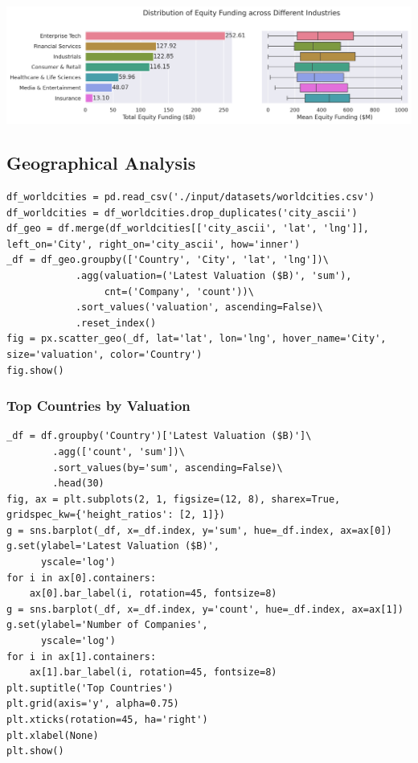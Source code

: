 \documentclass[a4paper,12pt]{article}
\begin{document}
\begin{center}
\includegraphics[width=.9\linewidth]{./.ob-jupyter/215e6c23cbc5b3bf332aa16d0f2fb53af47c666f.png}
\label{}
\end{center}
\subsection{Geographical Analysis}
\label{sec:orgfcdbb95}

\begin{verbatim}
df_worldcities = pd.read_csv('./input/datasets/worldcities.csv')
df_worldcities = df_worldcities.drop_duplicates('city_ascii')
df_geo = df.merge(df_worldcities[['city_ascii', 'lat', 'lng']], left_on='City', right_on='city_ascii', how='inner')
_df = df_geo.groupby(['Country', 'City', 'lat', 'lng'])\
            .agg(valuation=('Latest Valuation ($B)', 'sum'),
                 cnt=('Company', 'count'))\
            .sort_values('valuation', ascending=False)\
            .reset_index()
fig = px.scatter_geo(_df, lat='lat', lon='lng', hover_name='City', size='valuation', color='Country')
fig.show()
\end{verbatim}
\subsubsection{Top Countries by Valuation}
\label{sec:org7487562}

\begin{verbatim}
_df = df.groupby('Country')['Latest Valuation ($B)']\
        .agg(['count', 'sum'])\
        .sort_values(by='sum', ascending=False)\
        .head(30)
fig, ax = plt.subplots(2, 1, figsize=(12, 8), sharex=True, gridspec_kw={'height_ratios': [2, 1]})
g = sns.barplot(_df, x=_df.index, y='sum', hue=_df.index, ax=ax[0])
g.set(ylabel='Latest Valuation ($B)',
      yscale='log')
for i in ax[0].containers:
    ax[0].bar_label(i, rotation=45, fontsize=8)
g = sns.barplot(_df, x=_df.index, y='count', hue=_df.index, ax=ax[1])
g.set(ylabel='Number of Companies',
      yscale='log')
for i in ax[1].containers:
    ax[1].bar_label(i, rotation=45, fontsize=8)
plt.suptitle('Top Countries')
plt.grid(axis='y', alpha=0.75)
plt.xticks(rotation=45, ha='right')
plt.xlabel(None)
plt.show()
\end{verbatim}
\end{document}
